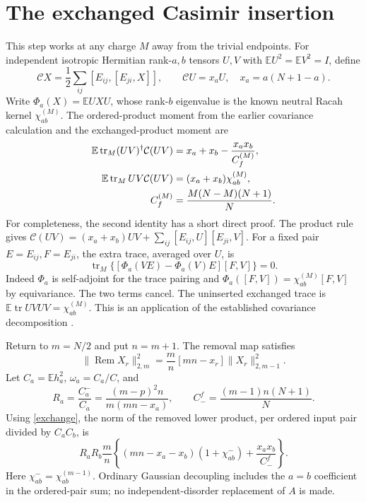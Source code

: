 \documentclass[11pt,a4paper]{article}
\newcommand{\EE}{\mathbb E}
\newcommand{\tr}{\operatorname{tr}}
\newcommand{\Rem}{\operatorname{Rem}}
\begin{document}
\newpage
\section{The exchanged Casimir insertion}
This step works at any charge $M$ away from the trivial endpoints.
For independent isotropic Hermitian rank-$a,b$ tensors $U,V$ with
$\EE U^2=\EE V^2=I$, define
\begin{equation}
 \mathcal C X=\frac12\sum_{ij}[E_{ij},[E_{ji},X]],\qquad
 \mathcal C U=x_aU,\quad x_a=a(N+1-a).
\end{equation}
Write $\Phi_a(X)=\EE UXU$, whose rank-$b$ eigenvalue is the
known neutral Racah kernel $\chi^{(M)}_{ab}$.
The ordered-product moment from the earlier covariance calculation
and the exchanged-product moment are
\begin{align}
 \EE\tr_M (UV)^\dagger\mathcal C(UV)
 &=x_a+x_b-\frac{x_ax_b}{C_f^{(M)}},\notag\\
 \EE\tr_M UV\mathcal C(UV)
 &=(x_a+x_b)\chi^{(M)}_{ab},\label{exchange}\\
 C_f^{(M)}&=\frac{M(N-M)(N+1)}N.\notag
\end{align}
For completeness, the second identity has a short direct proof.
The product rule gives
$\mathcal C(UV)=(x_a+x_b)UV+\sum_{ij}[E_{ij},U][E_{ji},V]$.
For a fixed pair $E=E_{ij},F=E_{ji}$, the extra trace, averaged
over $U$, is
\begin{equation}
 \tr_M\{[\Phi_a(VE)-\Phi_a(V)E][F,V]\}=0.
\end{equation}
Indeed $\Phi_a$ is self-adjoint for the trace pairing and
$\Phi_a([F,V])=\chi^{(M)}_{ab}[F,V]$ by equivariance.
The two terms cancel. The uninserted exchanged trace is
$\EE\tr UVUV=\chi^{(M)}_{ab}$. This is an application of
the established covariance decomposition \cite{kota}.

Return to $m=N/2$ and put $n=m+1$. The removal map satisfies
\begin{equation}
 \|\Rem X_r\|_{2,m}^2=
 \frac m n[mn-x_r]\|X_r\|_{2,m-1}^2.
\end{equation}
Let $C_a=\EE h_a^2$, $\omega_a=C_a/C$, and
\begin{equation}
 R_a=\frac{C_a^-}{C_a}=
 \frac{(m-p)^2 n}{m(mn-x_a)},\qquad
 C_-^f=\frac{(m-1)n(N+1)}N.
\end{equation}
Using \eqref{exchange}, the norm of the removed lower product,
per ordered input pair divided by $C_aC_b$, is
\begin{equation}
 R_aR_b\frac m n\left\{
 (mn-x_a-x_b)(1+\chi^-_{ab})+\frac{x_ax_b}{C_-^f}\right\}.
 \label{removed}
\end{equation}
Here $\chi^-_{ab}=\chi^{(m-1)}_{ab}$. Ordinary Gaussian
decoupling includes the $a=b$ coefficient in the ordered-pair sum;
no independent-disorder replacement of $A$ is made.
\end{document}
